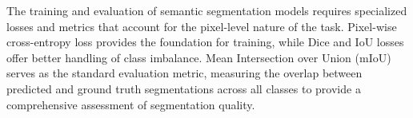 The training and evaluation of semantic segmentation models requires specialized losses and metrics that account for the pixel-level nature of the task. Pixel-wise cross-entropy loss provides the foundation for training, while Dice and IoU losses offer better handling of class imbalance. Mean Intersection over Union (mIoU) serves as the standard evaluation metric, measuring the overlap between predicted and ground truth segmentations across all classes to provide a comprehensive assessment of segmentation quality.\cite{Ronneberger2015}
